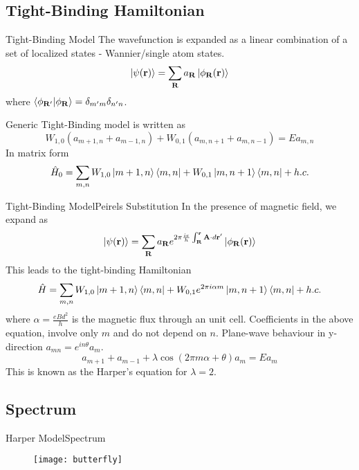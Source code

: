\documentclass{beamer}
\begin{document}
\subsection{Tight-Binding Hamiltonian}
\begin{frame}{Tight-Binding Model}
 The wavefunction is expanded as a linear combination of a set of localized states - Wannier/single atom states.
 \begin{equation*}
 \ket{\psi(\mathbf{r})} = \sum_{\mathbf{R}}{a_{\mathbf{R}} \ket{\phi_{\mathbf{R}}(\mathbf{r})}}
\end{equation*} where $\braket{\phi_{\mathbf{R}'}|\phi_{\mathbf{R}}} = \delta_{m'm}\delta_{n'n}$.

Generic Tight-Binding model is written as
\begin{equation}
 W_{1,0}(a_{m+1, n} + a_{m-1, n}) + W_{0, 1}(a_{m, n+1} + a_{m, n-1}) = Ea_{m, n}
\end{equation}
In matrix form
\begin{equation*}
\hat{H}_{0} = \sum_{m,n} W_{1,0}\ket{m+1, n}\bra{m, n} + W_{0,1}\ket{m, n+1}\bra{m, n} + h.c.
\end{equation*}
\end{frame}

\begin{frame}{Tight-Binding Model}{Peirels Substitution}\small
In the presence of magnetic field, we expand as
\begin{equation*}
 \ket{\psi(\mathbf{r})} = \sum_{\mathbf{R}}{a_{\mathbf{R}} e^{2\pi \frac{ie}{h}\int_{\mathbf{R}}^{\mathbf{r}}{\mathbf{A}\cdot d\mathbf{r}'}}\ket{\phi_{\mathbf{R}}(\mathbf{r})}}
\end{equation*} This leads to the tight-binding Hamiltonian
\begin{equation*}
 \hat{H} = \sum_{m, n} W_{1,0}\ket{m+1, n}\bra{m, n} + W_{0,1}e^{2\pi i \alpha m}\ket{m, n+1}\bra{m, n} + h.c.
\end{equation*} where $\alpha = \frac{eBd^2}{h}$ is the magnetic flux through an unit cell.
Coefficients in the above equation, involve only $m$ and do not depend on $n$.
Plane-wave behaviour in y-direction $a_{mn} = e^{in\theta}a_m$.
\begin{equation}
 a_{m+1} + a_{m-1} + \lambda \cos(2\pi m \alpha + \theta)a_{m} = Ea_{m}
\end{equation}
This is known as the \alert{Harper's equation} for $\lambda=2$.\normalsize
\end{frame}

\subsection{Spectrum}
\begin{frame}{Harper Model}{Spectrum}
\begin{figure}[h]
 \centering
 \texttt{[image: butterfly]}
\end{figure} 
\end{frame}
\end{document}
